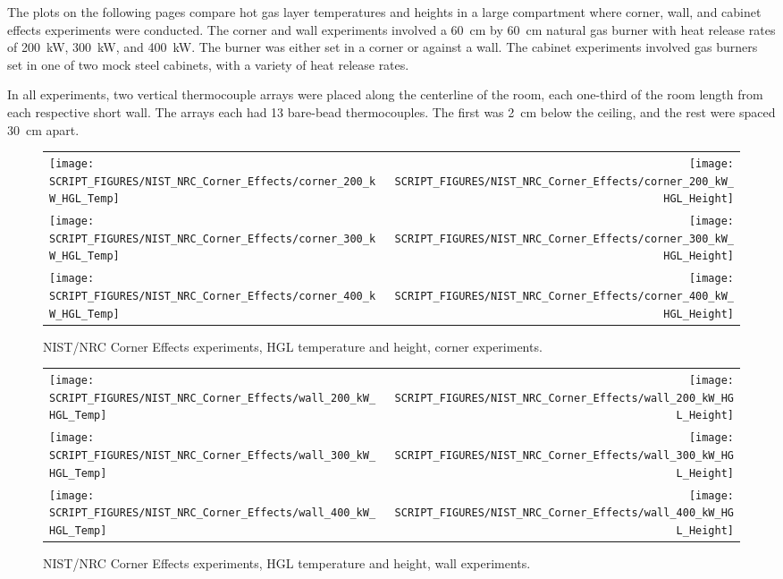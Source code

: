 The plots on the following pages compare hot gas layer temperatures and heights in a large compartment where corner, wall, and cabinet effects experiments were conducted. The corner and wall experiments involved a 60~cm by 60~cm natural gas burner with heat release rates of 200~kW, 300~kW, and 400~kW. The burner was either set in a corner or against a wall. The cabinet experiments involved gas burners set in one of two mock steel cabinets, with a variety of heat release rates.

In all experiments, two vertical thermocouple arrays were placed along the centerline of the room, each one-third of the room length from each respective short wall. The arrays each had 13 bare-bead thermocouples. The first was 2~cm below the ceiling, and the rest were spaced 30~cm apart.

\newpage

\begin{figure}[p]
\begin{tabular*}{\textwidth}{l@{\extracolsep{\fill}}r}
\texttt{[image: SCRIPT\_FIGURES/NIST\_NRC\_Corner\_Effects/corner\_200\_kW\_HGL\_Temp]} &
\texttt{[image: SCRIPT\_FIGURES/NIST\_NRC\_Corner\_Effects/corner\_200\_kW\_HGL\_Height]} \\
\texttt{[image: SCRIPT\_FIGURES/NIST\_NRC\_Corner\_Effects/corner\_300\_kW\_HGL\_Temp]} &
\texttt{[image: SCRIPT\_FIGURES/NIST\_NRC\_Corner\_Effects/corner\_300\_kW\_HGL\_Height]} \\
\texttt{[image: SCRIPT\_FIGURES/NIST\_NRC\_Corner\_Effects/corner\_400\_kW\_HGL\_Temp]} &
\texttt{[image: SCRIPT\_FIGURES/NIST\_NRC\_Corner\_Effects/corner\_400\_kW\_HGL\_Height]}
\end{tabular*}
\caption[NIST/NRC Corner Effects, HGL temperature and height, corner experiments]
{NIST/NRC Corner Effects experiments, HGL temperature and height, corner experiments.}
\label{NIST_NRC_Corner}
\end{figure}

\begin{figure}[p]
\begin{tabular*}{\textwidth}{l@{\extracolsep{\fill}}r}
\texttt{[image: SCRIPT\_FIGURES/NIST\_NRC\_Corner\_Effects/wall\_200\_kW\_HGL\_Temp]} &
\texttt{[image: SCRIPT\_FIGURES/NIST\_NRC\_Corner\_Effects/wall\_200\_kW\_HGL\_Height]} \\
\texttt{[image: SCRIPT\_FIGURES/NIST\_NRC\_Corner\_Effects/wall\_300\_kW\_HGL\_Temp]} &
\texttt{[image: SCRIPT\_FIGURES/NIST\_NRC\_Corner\_Effects/wall\_300\_kW\_HGL\_Height]} \\
\texttt{[image: SCRIPT\_FIGURES/NIST\_NRC\_Corner\_Effects/wall\_400\_kW\_HGL\_Temp]} &
\texttt{[image: SCRIPT\_FIGURES/NIST\_NRC\_Corner\_Effects/wall\_400\_kW\_HGL\_Height]}
\end{tabular*}
\caption[NIST/NRC Corner Effects, HGL temperature and height, wall experiments]
{NIST/NRC Corner Effects experiments, HGL temperature and height, wall experiments.}
\label{NIST_NRC_Wall}
\end{figure}

